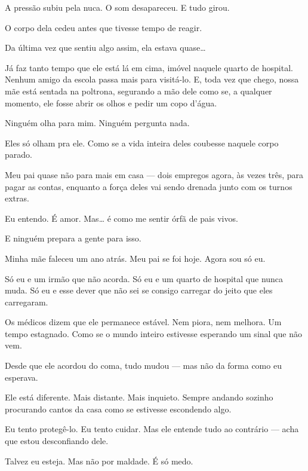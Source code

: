 A pressão subiu pela nuca.  
O som desapareceu.  
E tudo girou.

O corpo dela cedeu antes que tivesse tempo de reagir.

Da última vez que sentiu algo assim, ela estava quase…

\bigskip

Já faz tanto tempo que ele está lá em cima, imóvel naquele quarto de hospital.  
Nenhum amigo da escola passa mais para visitá-lo.  
E, toda vez que chego, nossa mãe está sentada na poltrona, segurando a mão dele como se, a qualquer momento, ele fosse abrir os olhos e pedir um copo d'água.

Ninguém olha para mim.  
Ninguém pergunta nada.

Eles só olham pra ele.  
Como se a vida inteira deles coubesse naquele corpo parado.

Meu pai quase não para mais em casa — dois empregos agora, às vezes três, para pagar as contas, enquanto a força deles vai sendo drenada junto com os turnos extras.

Eu entendo.  
É amor.  
Mas… é como me sentir órfã de pais vivos.

E ninguém prepara a gente para isso.

\bigskip

Minha mãe faleceu um ano atrás.  
Meu pai se foi hoje.  
Agora sou só eu.

Só eu e um irmão que não acorda.  
Só eu e um quarto de hospital que nunca muda.  
Só eu e esse dever que não sei se consigo carregar do jeito que eles carregaram.

Os médicos dizem que ele permanece estável.  
Nem piora, nem melhora.  
Um tempo estagnado.  
Como se o mundo inteiro estivesse esperando um sinal que não vem.

\bigskip

Desde que ele acordou do coma, tudo mudou — mas não da forma como eu esperava.

Ele está diferente.  
Mais distante.  
Mais inquieto.  
Sempre andando sozinho procurando cantos da casa como se estivesse escondendo algo.

Eu tento protegê-lo.  
Eu tento cuidar.  
Mas ele entende tudo ao contrário — acha que estou desconfiando dele.

Talvez eu esteja.  
Mas não por maldade.  
É só medo.

\bigskip

